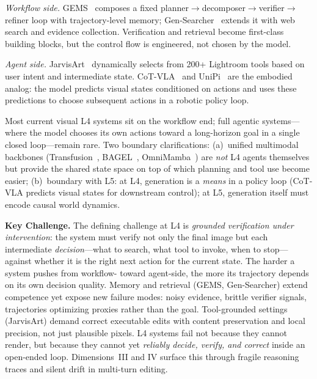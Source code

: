 \textit{Workflow side.} GEMS~\citep{he2026gems} composes a fixed planner$\to$decomposer$\to$verifier$\to$refiner loop with trajectory-level memory; Gen-Searcher~\citep{feng2026gen} extends it with web search and evidence collection. Verification and retrieval become first-class building blocks, but the control flow is engineered, not chosen by the model.

\textit{Agent side.} JarvisArt~\citep{lin2025jarvisart} dynamically selects from 200+ Lightroom tools based on user intent and intermediate state. CoT-VLA~\citep{zhao2025cotvla} and UniPi~\citep{du2023unipi} are the embodied analog: the model predicts visual states conditioned on actions and uses these predictions to choose subsequent actions in a robotic policy loop.

Most current visual L4 systems sit on the workflow end; full agentic systems---where the model chooses its own actions toward a long-horizon goal in a single closed loop---remain rare. Two boundary clarifications: (a)~unified multimodal backbones (Transfusion~\citep{zhou2024transfusion}, BAGEL~\citep{deng2025bagelemerging}, OmniMamba~\citep{zou2025omnimamba}) are \emph{not} L4 agents themselves but provide the shared state space on top of which planning and tool use become easier; (b)~boundary with L5: at L4, generation is a \emph{means} in a policy loop (CoT-VLA predicts visual states for downstream control); at L5, generation itself must encode causal world dynamics.

\textbf{Key Challenge.} The defining challenge at L4 is \emph{grounded verification under intervention}: the system must verify not only the final image but each intermediate \emph{decision}---what to search, what tool to invoke, when to stop---against whether it is the right next action for the current state. The harder a system pushes from workflow- toward agent-side, the more its trajectory depends on its own decision quality. Memory and retrieval (GEMS, Gen-Searcher) extend competence yet expose new failure modes: noisy evidence, brittle verifier signals, trajectories optimizing proxies rather than the goal. Tool-grounded settings (JarvisArt) demand correct executable edits with content preservation and local precision, not just plausible pixels. L4 systems fail not because they cannot render, but because they cannot yet \emph{reliably decide, verify, and correct} inside an open-ended loop.  Dimensions~III and IV surface this through fragile reasoning traces and silent drift in multi-turn editing.



